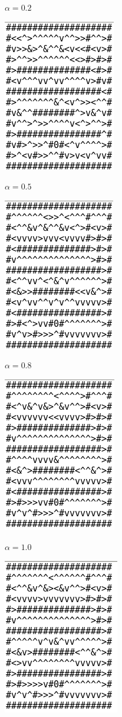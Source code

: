 \documentclass[11pt]{article}
\begin{document}
$\alpha = 0.2$

\includegraphics[scale=.5]{tst2-02.png}

$\alpha = 0.5$

\includegraphics[scale=.5]{tst2-05.png}

$\alpha = 0.8$

\includegraphics[scale=.5]{tst2-08.png}

$\alpha = 1.0$

\includegraphics[scale=.5]{tst2-10.png}
\end{document}
